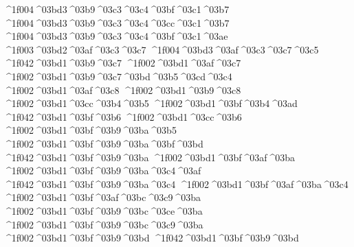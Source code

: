 {		^^^^1f004^^^^03bd3^^^^03b9^^^^03c3^^^^03c4^^^^03bf^^^^03c1^^^^03b7 		%
		^^^^1f004^^^^03bd3^^^^03b9^^^^03c3^^^^03c4^^^^03cc^^^^03c1^^^^03b7 		%
		^^^^1f004^^^^03bd3^^^^03b9^^^^03c3^^^^03c4^^^^03bf^^^^03c1^^^^03ae
	^^^^1f003^^^^03bd2^^^^03af^^^^03c3^^^^03c7   		%
		^^^^1f004^^^^03bd3^^^^03af^^^^03c3^^^^03c7^^^^03c5 		%
^^^^1f042^^^^03bd1^^^^03b9^^^^03c7     	   	%
^^^^1f002^^^^03bd1^^^^03af^^^^03c7	
^^^^1f002^^^^03bd1^^^^03b9^^^^03c7^^^^03bd^^^^03b5^^^^03cd^^^^03c4 		%
^^^^1f002^^^^03bd1^^^^03af^^^^03c8    		%
^^^^1f002^^^^03bd1^^^^03b9^^^^03c8
^^^^1f002^^^^03bd1^^^^03cc^^^^03b4^^^^03b5   		%
^^^^1f002^^^^03bd1^^^^03bf^^^^03b4^^^^03ad
^^^^1f042^^^^03bd1^^^^03bf^^^^03b6    		%
^^^^1f002^^^^03bd1^^^^03cc^^^^03b6
^^^^1f002^^^^03bd1^^^^03bf^^^^03b9^^^^03ba^^^^03b5		%
^^^^1f002^^^^03bd1^^^^03bf^^^^03b9^^^^03ba^^^^03bf^^^^03bd  		%
^^^^1f042^^^^03bd1^^^^03bf^^^^03b9^^^^03ba   		%
^^^^1f002^^^^03bd1^^^^03bf^^^^03af^^^^03ba
^^^^1f002^^^^03bd1^^^^03bf^^^^03b9^^^^03ba^^^^03c4^^^^03af  		%
^^^^1f042^^^^03bd1^^^^03bf^^^^03b9^^^^03ba^^^^03c4  		%
^^^^1f002^^^^03bd1^^^^03bf^^^^03af^^^^03ba^^^^03c4
^^^^1f002^^^^03bd1^^^^03bf^^^^03af^^^^03bc^^^^03c9^^^^03ba 		%
^^^^1f002^^^^03bd1^^^^03bf^^^^03b9^^^^03bc^^^^03ce^^^^03ba
^^^^1f002^^^^03bd1^^^^03bf^^^^03b9^^^^03bc^^^^03c9^^^^03ba  		%
^^^^1f002^^^^03bd1^^^^03bf^^^^03b9^^^^03bd    		%
^^^^1f042^^^^03bd1^^^^03bf^^^^03b9^^^^03bd   		%
}
